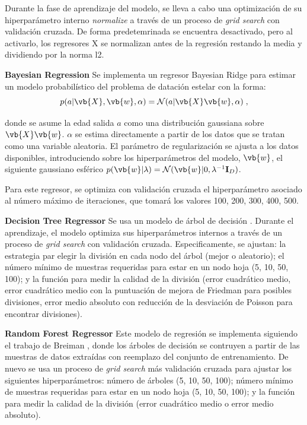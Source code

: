 Durante la fase de aprendizaje del modelo, se lleva a cabo una optimización de su hiperparámetro interno \emph{normalize} a través de un proceso de \emph{grid search} con validación cruzada. De forma predetemrinada se encuentra desactivado, pero al activarlo, los regresores X se normalizan antes de la regresión restando la media y dividiendo por la norma l2.

\vspace{0.5cm}

\textbf{Bayesian Regression} {} Se implementa un regresor Bayesian Ridge para estimar un modelo probabilístico del problema de datación estelar con la forma:
\begin{equation}
p(a|\vb{X},\vb{w},\alpha) = \mathcal{N}(a|\vb{X} \vb{w},\alpha)\; ,
\end{equation}

donde se asume la edad salida $a$ como una distribución gaussiana sobre $\vb{X}\vb{w}$. $\alpha$ se estima directamente a partir de los datos que se tratan como una variable aleatoria. El parámetro de regularización se ajusta a los datos disponibles, introduciendo sobre los hiperparámetros del modelo, \ie $\vb{w}$, el siguiente gaussiano esférico $p(\vb{w}|\lambda) =
\mathcal{N}(\vb{w}|0,\lambda^{-1}\mathbf{I}_{D})$.

Para este regresor, se optimiza con validación cruzada el hiperparámetro asociado al número máximo de iteraciones, que tomará los valores 100, 200, 300, 400, 500.

\vspace{0.5cm}

\textbf{Decision Tree Regressor} {} Se usa un modelo de árbol de decisión \cite{Breiman1984}. Durante el aprendizaje, el modelo optimiza sus hiperparámetros internos a través de un proceso de \emph{grid search} con validación cruzada. Especificamente, se ajustan: la estrategia par elegir la división en cada nodo del árbol (mejor o aleatorio); el número mínimo de muestras requeridas para estar en un nodo hoja (5, 10, 50, 100); y la función para medir la calidad de la división (error cuadrático medio, error cuadrático medio con la puntuación de mejora de Friedman para posibles divisiones, error medio absoluto con reducción de la desviación de Poisson para encontrar divisiones). 

\vspace{0.5cm}

\textbf{Random Forest Regressor} {} Este modelo de regresión se implementa siguiendo el trabajo de Breiman \cite{Breiman2001}, donde los árboles de decisión se contruyen a partir de las muestras de datos extraídas con reemplazo del conjunto de entrenamiento. De nuevo se usa un proceso de \emph{grid search} más validación cruzada para ajustar los siguientes hiperparámetros: número de árboles (5, 10, 50, 100); número mínimo de muestras requeridas para estar en un nodo hoja (5, 10, 50, 100); y la función para medir la calidad de la división (error cuadrático medio o error medio absoluto).

